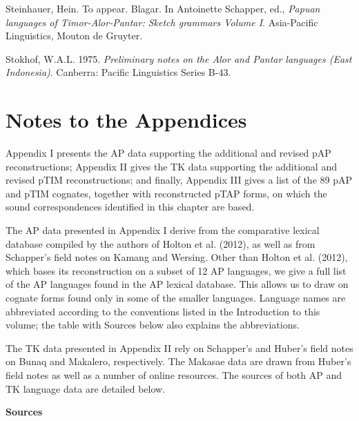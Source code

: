 Steinhauer, Hein. To appear. Blagar. In Antoinette Schapper, ed., \textit{Papuan languages of Timor-Alor-Pantar: Sketch grammars Volume I}. Asia-Pacific Linguistics, Mouton de Gruyter.

Stokhof, W.A.L. 1975. \textit{Preliminary notes on the Alor and Pantar languages (East Indonesia)}. Canberra: Pacific Linguistics Series B-43.

\clearpage\section[Notes to the Appendices]{Notes to the Appendices}
\hypertarget{RefHeading65427871885726}{}Appendix I presents the AP data supporting the additional and revised pAP reconstructions; Appendix II gives the TK data supporting the additional and revised pTIM reconstructions; and finally, Appendix III gives a list of the 89 pAP and pTIM cognates, together with reconstructed pTAP forms, on which the sound correspondences identified in this chapter are based. 

The AP data presented in Appendix I derive from the comparative lexical database compiled by the authors of Holton et al. (2012), as well as from Schapper{\textquoteright}s field notes on Kamang and Wersing. Other than Holton et al. (2012), which bases its reconstruction on a subset of 12 AP languages, we give a full list of the AP languages found in the AP lexical database. This allows us to draw on cognate forms found only in some of the smaller languages. Language names are abbreviated according to the conventions listed in the Introduction to this volume; the table with Sources below also explains the abbreviations.

The TK data presented in Appendix II rely on Schapper{\textquoteright}s and Huber{\textquoteright}s field notes on Bunaq and Makalero, respectively. The Makasae data are drawn from Huber{\textquoteright}s field notes as well as a number of online resources. The sources of both AP and TK language data are detailed below.

\textbf{Sources}

